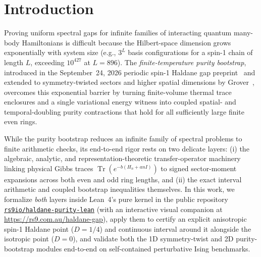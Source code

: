 \documentclass[11pt,a4paper]{article}
\newcommand{\id}[1]{{\small\nolinkurl{#1}}}
\newcommand{\Tr}{\operatorname{Tr}}
\begin{document}
\section{Introduction}
Proving uniform spectral gaps for infinite families of interacting quantum many-body Hamiltonians is difficult because the Hilbert-space dimension grows exponentially with system size (e.g., $3^L$ basis configurations for a spin-1 chain of length $L$, exceeding $10^{427}$ at $L = 896$).
The \emph{finite-temperature purity bootstrap}, introduced in the September~24, 2026 periodic spin-1 Haldane gap preprint~\cite{openai2026haldane} and extended to symmetry-twisted sectors and higher spatial dimensions by Grover~\cite{grover2026}, overcomes this exponential barrier by turning finite-volume thermal trace enclosures and a single variational energy witness into coupled spatial- and temporal-doubling purity contractions that hold for all sufficiently large finite even rings.

While the purity bootstrap reduces an infinite family of spectral problems to finite arithmetic checks, its end-to-end rigor rests on two delicate layers: (i) the algebraic, analytic, and representation-theoretic transfer-operator machinery linking physical Gibbs traces $\Tr(e^{-b(H_n + a n I)})$ to signed sector-moment expansions across both even and odd ring lengths, and (ii) the exact interval arithmetic and coupled bootstrap inequalities themselves.
In this work, we formalize \emph{both} layers inside Lean~4's pure kernel in the public repository \href{https://github.com/rs9io/haldane-purity-lean}{\id{rs9io/haldane-purity-lean}} (with an interactive visual companion at \url{https://rs9.com.au/haldane-gap}), apply them to certify an explicit anisotropic spin-1 Haldane point ($D = 1/4$) and continuous interval around it alongside the isotropic point ($D = 0$), and validate both the 1D symmetry-twist and 2D purity-bootstrap modules end-to-end on self-contained perturbative Ising benchmarks.
\end{document}
